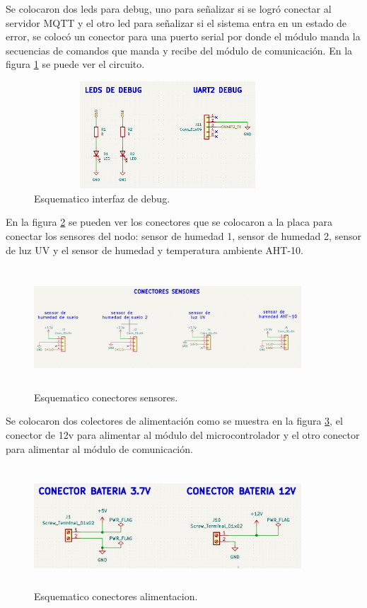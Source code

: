 Se colocaron dos leds para debug, uno para señalizar si se logró conectar al servidor MQTT y el otro led para señalizar si el sistema entra en un estado de error, se colocó un conector para una puerto serial por donde el módulo manda la secuencias de comandos que manda y recibe del módulo de comunicación. En la figura \ref{fig:esquematico conectores de debug} se puede ver el circuito.
\begin{figure}[h!]
  \centering
	\includegraphics[width=10cm, height=4cm]{./Figures/esquematico_debug.png}
	\caption{Esquematico interfaz de debug.}
	\label{fig:esquematico conectores de debug}
\end{figure}

En la figura \ref{fig:esquematico conectores sensores} se pueden ver los conectores que se colocaron a la placa para conectar los sensores del nodo: sensor de humedad 1, sensor de humedad 2, sensor de luz UV y el sensor de humedad y temperatura ambiente AHT-10.
\begin{figure}[h]
  \centering
	\includegraphics[width=10cm, height=4.5cm]{./Figures/esquematico_conectores_sensores.png}
	\caption{Esquematico conectores sensores.}
	\label{fig:esquematico conectores sensores}
\end{figure}

Se colocaron dos colectores de alimentación como se muestra en la figura \ref{fig:esquematico conectores alimentacion}, el conector de 12v para alimentar al módulo del microcontrolador y el otro conector para alimentar al módulo de comunicación.
\begin{figure}[h]
  \centering
	\includegraphics[width=10cm, height=4.5cm]{./Figures/esquematico_alimentacion.png}
	\caption{Esquematico conectores alimentacion.}
	\label{fig:esquematico conectores alimentacion}
\end{figure}

